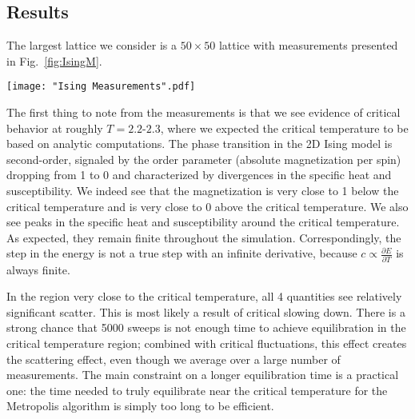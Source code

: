 \documentclass[twocolumn,aps,prl]{revtex4-1} %
\newcommand{\pd}{\partial}
\begin{document}
\subsection{Results}
The largest lattice we consider is a $50 \times 50$ lattice with measurements presented in Fig.~\ref{fig:IsingM}.
\begin{figure*}
	\texttt{[image: "Ising Measurements".pdf]}
	\caption{\label{fig:IsingM}Plots showing the mean energy per spin, specific heat per spin, mean (absolute) magnetization per spin, magnetic susceptibility for the Ising model on a 50 $\times$ 50 lattice from $T = 1.6$ to $T = 2.9$ in increments of $\Delta T = .01$. The lines overlaid on the data are lines of best-of-fit determined using \texttt{optimize.curve\_fit}. The equilibration time at each temperature is 5000 sweeps and each data point is obtained from 5000 measurements. The error bars computed using the bootstrap method are too small to see.}
\end{figure*}

The first thing to note from the measurements is that we see evidence of critical behavior at roughly $T = 2.2$-$2.3$, where we expected the critical temperature to be based on analytic computations. The phase transition in the 2D Ising model is second-order, signaled by the order parameter (absolute magnetization per spin) dropping from 1 to 0 and characterized by divergences in the specific heat and susceptibility. We indeed see that the magnetization is very close to 1 below the critical temperature and is very close to 0 above the critical temperature. We also see peaks in the specific heat and susceptibility around the critical temperature. As expected, they remain finite throughout the simulation. Correspondingly, the step in the energy is not a true step with an infinite derivative, because $c \propto \frac{\pd E}{\pd T}$ is always finite.

In the region very close to the critical temperature, all 4 quantities see relatively significant scatter. This is most likely a result of critical slowing down. There is a strong chance that 5000 sweeps is not enough time to achieve equilibration in the critical temperature region; combined with critical fluctuations, this effect creates the scattering effect, even though we average over a large number of measurements. The main constraint on a longer equilibration time is a practical one: the time needed to truly equilibrate near the critical temperature for the Metropolis algorithm is simply too long to be efficient.
\end{document}
